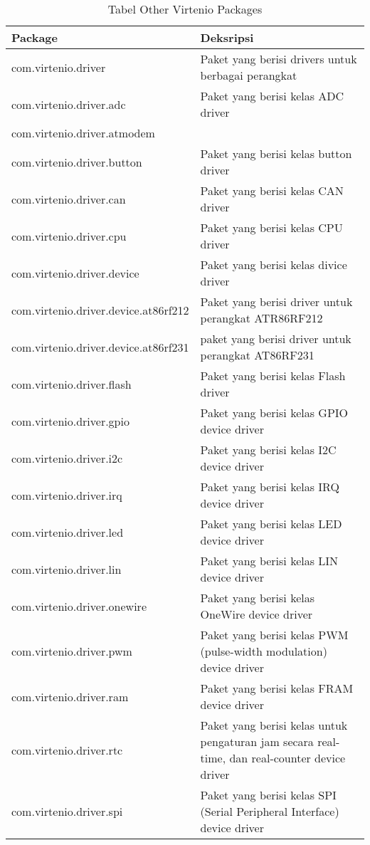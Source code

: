\begin{table}[H] %
	\centering 
	\caption{Tabel Other Virtenio Packages}
	\label{tab:other_packages}
	\begin{tabular}{|p{6cm}|p{10cm}|}
		\hline
		Package & Deksripsi \\

		\hline
		com.virtenio.driver & Paket yang berisi drivers untuk berbagai perangkat \\
		com.virtenio.driver.adc  & Paket yang berisi kelas ADC driver \\
		com.virtenio.driver.atmodem & \\
		com.virtenio.driver.button & Paket yang berisi kelas button driver \\
		com.virtenio.driver.can & Paket yang berisi kelas CAN driver \\
		com.virtenio.driver.cpu & Paket yang berisi kelas CPU driver \\
		com.virtenio.driver.device & Paket yang berisi kelas divice driver \\
		com.virtenio.driver.device.at86rf212 & Paket yang berisi driver untuk perangkat ATR86RF212 \\
		com.virtenio.driver.device.at86rf231 & paket yang berisi driver untuk perangkat AT86RF231 \\
		com.virtenio.driver.flash & Paket yang berisi kelas Flash driver  \\
		com.virtenio.driver.gpio & Paket yang berisi kelas GPIO device driver \\
		com.virtenio.driver.i2c & Paket yang berisi kelas I2C device driver \\
		com.virtenio.driver.irq & Paket yang berisi kelas IRQ device driver \\
		com.virtenio.driver.led & Paket yang berisi kelas LED device driver \\
		com.virtenio.driver.lin & Paket yang berisi kelas LIN device driver\\
		com.virtenio.driver.onewire & Paket yang berisi kelas OneWire device driver\\
		com.virtenio.driver.pwm & Paket yang berisi kelas PWM (pulse-width modulation) device driver\\
		com.virtenio.driver.ram & Paket yang berisi kelas FRAM device driver \\
		com.virtenio.driver.rtc & Paket yang berisi kelas untuk pengaturan jam secara real-time, dan real-counter device driver \\
		com.virtenio.driver.spi & Paket yang berisi kelas SPI (Serial Peripheral Interface) device driver \\

\end{tabular}
\end{table}

